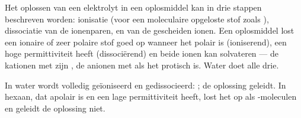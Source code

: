 \begin{proposition}\label{prop:b1:intermolecular-forces-solvents:steps}
Het oplossen van een elektrolyt in een oplosmiddel kan in drie stappen
beschreven worden: ionisatie (voor een moleculaire opgeloste stof zoals
), dissociatie van de ionenparen, en  van de
gescheiden ionen. Een oplosmiddel lost een ionaire of zeer polaire stof
goed op wanneer het polair is (ioniserend), een hoge permittiviteit heeft
(dissociërend) en beide ionen kan solvateren --- de kationen met zijn
, de anionen met  als het protisch is. Water
doet alle drie.
\end{proposition}

\begin{example}\label{ex:b1:intermolecular-forces-solvents:hcl}
In water wordt  volledig geïoniseerd en gedissocieerd:
; de oplossing geleidt. In
hexaan, dat apolair is en een lage permittiviteit heeft, lost het op als
-moleculen en geleidt de oplossing niet.
\end{example}

